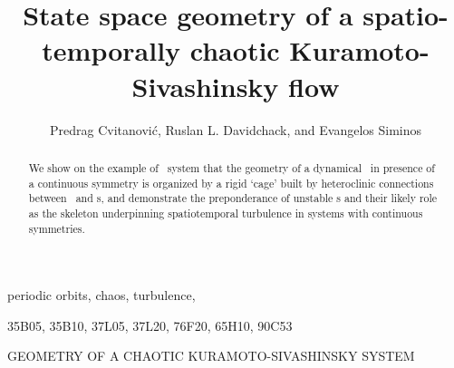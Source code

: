 \documentclass{siamltex}
\begin{document}
                \title{
State space geometry of a spatio-temporally chaotic
Kuramoto-Sivashinsky flow
                 }
                  \author{
Predrag Cvitanovi\'c\footnotemark[1],
Ruslan L. Davidchack\footnotemark[2],
    and
Evangelos Siminos\footnotemark[1]
                    }


                \maketitle

\renewcommand{\thefootnote}{\fnsymbol{footnote}}
\renewcommand{\thefootnote}{\arabic{footnote}}

                \begin{abstract}
We show on the example of \KS\ system
that the geometry of a dynamical \statesp\ in presence of
a continuous symmetry is organized by
a rigid `cage' built by heteroclinic connections
between \eqva\ and \rpo s, and demonstrate the
preponderance of unstable \rpo s and their likely
role as the skeleton underpinning spatiotemporal turbulence in
systems with continuous symmetries.
                \end{abstract}

\begin{keywords}
periodic orbits, chaos, turbulence, {\KSe}
\end{keywords}

\begin{AMS}
35B05, 35B10, 37L05, 37L20, 76F20, 65H10, 90C53
\end{AMS}

\pagestyle{myheadings}
\thispagestyle{plain}
         {GEOMETRY OF A CHAOTIC KURAMOTO-SIVASHINSKY SYSTEM}
\end{document}
